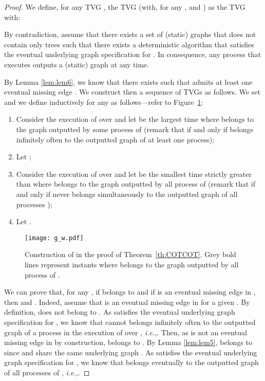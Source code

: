 \documentclass[11pt]{article}
\newcommand{\ie}{{\em i.e.,}\xspace}
\begin{document}
\begin{proof}
We define, for any TVG ,  the TVG  (with, for any ,  and ) as the TVG  with:


By contradiction, assume that there exists a set of (static) graphs  that does not contain only trees such that there exists a deterministic algorithm  that satisfies the eventual underlying graph specification for . In consequence, any process that executes  outputs a (static) graph at any time.

By Lemma \ref{lem:lem6}, we know that there exists  such that  admits at least one eventual missing edge . We construct then a sequence  of TVGs as follows. We set  and we define inductively  for any  as follows---refer to Figure~\ref{fig:g_w}:

\begin{enumerate}
\item Consider the execution of  over  and let  be the largest time where  belongs to the graph outputted by some process of  (remark that  if and only if  belongs infinitely often to the outputted graph of at least one process);
\item Let ;
\item Consider the execution of  over  and let  be the smallest time strictly greater than  where  belongs to the graph outputted by all process of  (remark that  if and only if  never belongs simultaneously to the outputted graph of all processes );
\item Let .
\end{enumerate}

\begin{figure}
  \centering 
  \texttt{[image: g\_w.pdf]}
  \caption{Construction of  in the proof of Theorem~\ref{th:COTCOT}. Grey bold lines represent instants where  belongs to the graph outputted by all process of . \label{fig:g_w}}
\end{figure}

We can prove that, for any , if  belongs to  and if  is an eventual missing edge in , then  and . Indeed, assume that  is an eventual missing edge in  for a given . By definition,  does not belong to . As  satisfies the eventual underlying graph specification for , we know that  cannot belongs infinitely often to the outputted graph of a process in the execution of  over , \ie . Then, as  is not an eventual missing edge in  by construction,  belongs to . By Lemma \ref{lem:lem5},  belongs to  since  and  share the same underlying graph . As  satisfies the eventual underlying graph specification for , we know that  belongs eventually to the outputted graph of all processes of , \ie .


\end{proof}
\end{document}
